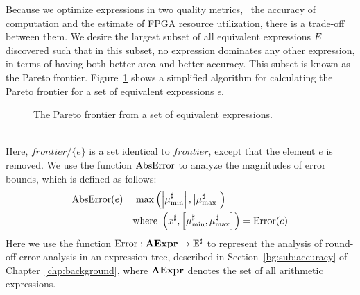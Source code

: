 Because we optimize expressions in two quality metrics, \ie~the accuracy of
computation and the estimate of FPGA resource utilization, there is a trade-off
between them. We desire the largest subset of all equivalent expressions
$E$ discovered such that in this subset, no expression dominates any other
expression, in terms of having both better area and better accuracy. This
subset is known as the Pareto frontier.  Figure~\ref{so:alg:pareto} shows
a simplified algorithm for calculating the Pareto frontier for a set of
equivalent expressions $\epsilon$.
\begin{figure}[ht]
    \centering
    \begin{algorithmic}
                    \EndIf{}
                \EndFor{}
            \EndFor{}
        \EndFunction%
    \end{algorithmic}
    \caption{The Pareto frontier from a set of equivalent expressions.
    }\label{so:alg:pareto}
\end{figure} \\
Here, $\mathit{frontier} / \{ e \}$ is a set identical to $\mathit{frontier}$,
except that the element $e$ is removed.  We use the function $\operatorname{\mathrm{AbsError}}$ to
analyze the magnitudes of error bounds, which is defined as follows:
\begin{equation}
    \begin{aligned}
        \operatorname{\mathrm{AbsError}}(e) &= \max\left(
            \left| \mu^\sharp_{\min} \right|,
            \left| \mu^\sharp_{\max} \right|
        \right) \\
        & \quad \text{where~}
        \left(
            x^\sharp, \left[ \mu^\sharp_{\min}, \mu^\sharp_{\max} \right]
        \right) = \operatorname{\mathrm{Error}}(e)
    \end{aligned}
\end{equation}
Here we use the function $\operatorname{\mathrm{Error}}: \mathbf{AExpr}\to\mathbb{E}^\sharp$ to represent the
analysis of round-off error analysis in an expression tree, described
in Section~\ref{bg:sub:accuracy} of Chapter~\ref{chp:background}, where
$\mathbf{AExpr}$ denotes the set of all arithmetic expressions.


